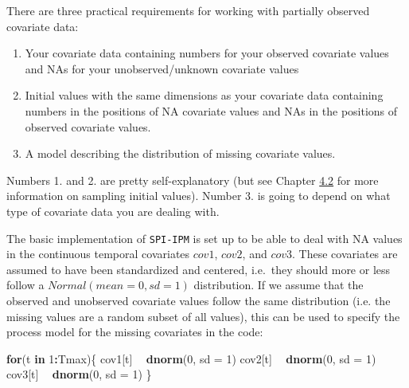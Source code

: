 \documentclass[
]{book}
\newenvironment{Shaded}{\begin{snugshade}}{\end{snugshade}}
\newcommand{\ControlFlowTok}[1]{\textcolor[rgb]{0.13,0.29,0.53}{\textbf{#1}}}
\newcommand{\DataTypeTok}[1]{\textcolor[rgb]{0.13,0.29,0.53}{#1}}
\newcommand{\DecValTok}[1]{\textcolor[rgb]{0.00,0.00,0.81}{#1}}
\newcommand{\KeywordTok}[1]{\textcolor[rgb]{0.13,0.29,0.53}{\textbf{#1}}}
\newcommand{\NormalTok}[1]{#1}
\newcommand{\OperatorTok}[1]{\textcolor[rgb]{0.81,0.36,0.00}{\textbf{#1}}}
\newcommand{\StringTok}[1]{\textcolor[rgb]{0.31,0.60,0.02}{#1}}
\begin{document}
There are three practical requirements for working with partially observed
covariate data:

\begin{enumerate}
\def\labelenumi{\arabic{enumi}.}
\item
  Your covariate data containing numbers for your observed covariate values and NAs for your unobserved/unknown covariate values
\item
  Initial values with the same dimensions as your covariate data containing
  numbers in the positions of NA covariate values and NAs in the positions of
  observed covariate values.
\item
  A model describing the distribution of missing covariate values.
\end{enumerate}

Numbers 1. and 2. are pretty self-explanatory (but see Chapter \protect\hyperlink{ux5cux23ux5cux2520Simulationux5cux2520ofux5cux2520initialux5cux2520values}{4.2} for more information on sampling initial values).
Number 3. is going to depend on what type of covariate data you are dealing with.

The basic implementation of \texttt{SPI-IPM} is set up to be able to deal with NA
values in the continuous temporal covariates \(cov1\), \(cov2\), and \(cov3\). These
covariates are assumed to have been standardized and centered, i.e.~they should
more or less follow a \(Normal(mean= 0, sd = 1)\) distribution. If we assume that
the observed and unobserved covariate values follow the same distribution (i.e.
the missing values are a random subset of all values), this can be used to
specify the process model for the missing covariates in the code:

\begin{Shaded}
\begin{Highlighting}[]
\ControlFlowTok{for}\NormalTok{(t }\ControlFlowTok{in} \DecValTok{1}\OperatorTok{:}\NormalTok{Tmax)\{}
\NormalTok{  cov1[t] }\OperatorTok{~}\StringTok{ }\KeywordTok{dnorm}\NormalTok{(}\DecValTok{0}\NormalTok{, }\DataTypeTok{sd =} \DecValTok{1}\NormalTok{)}
\NormalTok{  cov2[t] }\OperatorTok{~}\StringTok{ }\KeywordTok{dnorm}\NormalTok{(}\DecValTok{0}\NormalTok{, }\DataTypeTok{sd =} \DecValTok{1}\NormalTok{)}
\NormalTok{  cov3[t] }\OperatorTok{~}\StringTok{ }\KeywordTok{dnorm}\NormalTok{(}\DecValTok{0}\NormalTok{, }\DataTypeTok{sd =} \DecValTok{1}\NormalTok{)}
\NormalTok{\}}
\end{Highlighting}
\end{Shaded}
\end{document}
